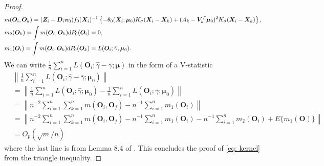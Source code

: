 \documentclass[12pt]{article}
\begin{document}
{\begin{proof}
\begin{align*}
  &m(\bm O_i , \bm O_k) = (\bm{Z}_i -\bm D_i \bm\pi_0 ) f_0(\bm{X}_i)^{-1} \left\{ - \theta_0 (\bm{X}_i;\bm\mu_0 ) K_\sigma(\bm{X}_i - \bm{X}_k)  + (A_k - \bm{V}_k^T \bm \mu_0  )^2  K_\sigma(\bm{X}_i - \bm{X}_k )\right\}, \\
  &m_2(\bm O_k ) = \int m (\bm O_i, \bm O_k) dP_0(\bm O_i)  = 0, \\
  & m_1(\bm O_i ) = \int m (\bm O_i, \bm O_k) dP_0(\bm O_k) = L(\bm O_i; \bar\gamma, \bm \mu_0 ).
\end{align*}
We can write $   \frac1n  \sum_{i=1}^{n} L(\bm O_i; \hat\gamma- \bar \gamma; \bm\mu ) $ in the form of a  V-statistic 
\begin{align*}
	&\left\| \frac1n  \sum_{i=1}^{n} L(\bm O_i; \hat\gamma- \bar \gamma; \bm\mu_0  ) \right\|\\
	&=  \left\|  \frac1n  \sum_{i=1}^{n} L(\bm O_i; \hat\gamma; \bm\mu_0  ) -  \frac1n  \sum_{i=1}^{n} L(\bm O_i;\bar \gamma; \bm\mu_0  ) \right\| \\
		&=\left\|  n^{-2} \sum_{i=1}^{n} \sum_{k=1}^{n} m(\bm O_i, \bm O_j) - n^{-1} \sum_{i=1}^{n} m_1(\bm O_i)  \right\| \\
		&= \left\| n^{-2} \sum_{i=1}^{n} \sum_{k=1}^{n} m(\bm O_i, \bm O_j) - n^{-1} \sum_{i=1}^{n} m_1(\bm O_i)  - n^{-1} \sum_{i=1}^{n} m_2(\bm O_i) + E\{ m_1(\bm O)\}  \right\|\\
		&= O_p(\sqrt{m}/n ) 
\end{align*}
where the last line is from Lemma 8.4 of \cite{Newey1994_handbook}. This concludes the proof of \eqref{eq: kernel} from the triangle inequality. 


\end{proof}}
\end{document}
